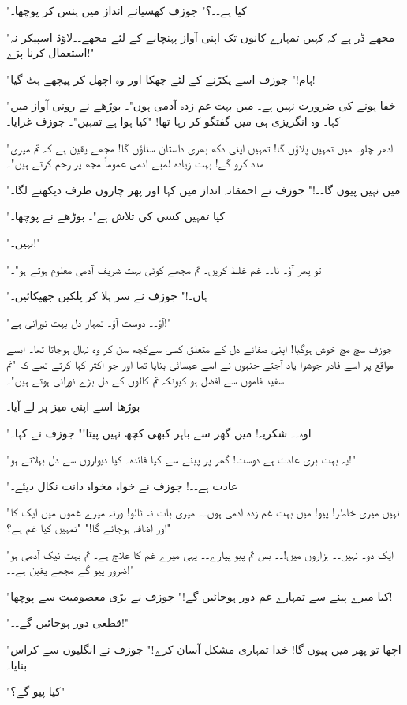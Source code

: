 "کیا ہے۔۔؟" جوزف کھسیانے انداز میں ہنس کر پوچھا۔

"مجھے ڈر ہے کہ کہیں تمہارے کانوں تک اپنی آواز پہنچانے کے لئے مجھے۔۔لاؤڈ اسپیکر نہ استعمال کرنا پڑے!"

"ہام!" جوزف اسے پکڑنے کے لئے جھکا اور وہ اچھل کر پیچھے ہٹ گیا!

"خفا ہونے کی ضرورت نہیں ہے۔ میں بہت غم زدہ آدمی ہوں"۔ بوڑھے نے رونی آواز میں کہا۔ وہ انگریزی ہی میں گفتگو کر رہا تھا!
"کیا ہوا ہے تمہیں"۔ جوزف غرایا۔

"ادھر چلو۔ میں تمہیں پلاؤں گا! تمہیں اپنی دکھ بھری داستان سناؤں گا! مجھے یقین ہے کہ تم میری مدد کرو گے! بہت زیادہ لمبے آدمی عموماً مجھ پر رحم کرتے ہیں"۔

"میں نہیں پیوں گا۔۔!" جوزف نے احمقانہ انداز میں کہا اور پھر چاروں طرف دیکھنے لگا۔

"کیا تمہیں کسی کی تلاش ہے"۔ بوڑھے نے پوچھا۔

"نہیں۔!"

"تو پھر آؤ۔ نا۔۔ غم غلط کریں۔ تم مجھے کوئی بہت شریف آدمی معلوم ہوتے ہو"۔

"ہاں۔!" جوزف نے سر ہلا کر پلکیں جھپکائیں۔

"آؤ۔۔ دوست آؤ۔ تمہار دل بہت نورانی ہے!"

جوزف سچ مچ خوش ہوگیا! اپنی صفائے دل کے متعلق کسی سےکچھ سن کر وہ نہال ہوجاتا تھا۔ ایسے مواقع پر اسے فادر جوشوا یاد آجتے جنہوں نے اسے عیسائی بنایا تھا اور جو اکثر کہا کرتے تھے کہ "تم سفید فاموں سے افضل ہو کیونکہ تم کالوں کے دل بڑے نورانی ہوتے ہیں"۔

بوڑھا اسے اپنی میز پر لے آیا۔

"اوہ۔۔ شکریہ! میں گھر سے باہر کبھی کچھ نہیں پیتا!" جوزف نے کہا۔

"یہ بہت بری عادت ہے دوست! گھر پر پینے سے کیا فائدہ۔ کیا دیواروں سے دل بہلاتے ہو!"

"عادت ہے۔۔! جوزف نے خواہ مخواہ دانت نکال دیئے۔

"نہیں میری خاطر! پیو! میں بہت غم زدہ آدمی ہوں۔۔ میری بات نہ ٹالو! ورنہ میرے غموں میں ایک کا اور اضافہ ہوجائے گا!"
"تمہیں کیا غم ہے؟"

"ایک دو۔ نہیں۔۔ ہزاروں میں!۔۔ بس تم پیو پیارے۔۔ یہی میرے غم کا علاج ہے۔ تم بہت نیک آدمی ہو ضرور پیو گے مجھے یقین ہے۔۔!"

"کیا میرے پینے سے تمہارے غم دور ہوجائیں گے!" جوزف نے بڑی معصومیت سے پوچھا!

"قطعی دور ہوجائیں گے۔۔!"

"اچھا تو پھر میں پیوں گا! خدا تمہاری مشکل آسان کرے!" جوزف نے انگلیوں سے کراس بنایا۔

"کیا پیو گے؟"

